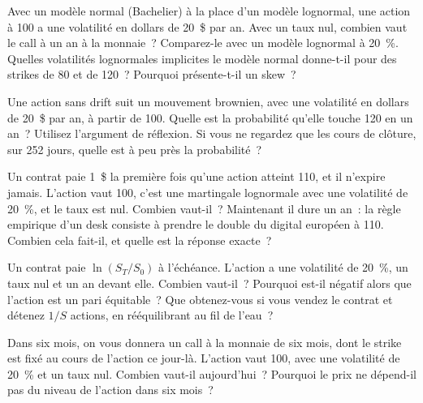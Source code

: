 \begin{question}\label{iq:iv2:pricing-and-numerics:19}
Avec un modèle normal (Bachelier) à la place d'un modèle lognormal, une action à 100 a une volatilité en dollars de 20~\$ par an. Avec un taux nul, combien vaut le call à un an à la monnaie~? Comparez-le avec un modèle lognormal à 20~\%. Quelles volatilités lognormales implicites le modèle normal donne-t-il pour des strikes de 80 et de 120~? Pourquoi présente-t-il un skew~?
\end{question}

\begin{question}\label{iq:iv2:pricing-and-numerics:20}
Une action sans drift suit un mouvement brownien, avec une volatilité en dollars de 20~\$ par an, à partir de 100. Quelle est la probabilité qu'elle touche 120 en un an~? Utilisez l'argument de réflexion. Si vous ne regardez que les cours de clôture, sur 252 jours, quelle est à peu près la probabilité~?
\end{question}

\begin{question}\label{iq:iv2:pricing-and-numerics:21}
Un contrat paie 1~\$ la première fois qu'une action atteint 110, et il n'expire jamais. L'action vaut 100, c'est une martingale lognormale avec une volatilité de 20~\%, et le taux est nul. Combien vaut-il~? Maintenant il dure un an~: la règle empirique d'un desk consiste à prendre le double du digital européen à 110. Combien cela fait-il, et quelle est la réponse exacte~?
\end{question}

\begin{question}\label{iq:iv2:pricing-and-numerics:22}
Un contrat paie $\ln(S_T/S_0)$ à l'échéance. L'action a une volatilité de 20~\%, un taux nul et un an devant elle. Combien vaut-il~? Pourquoi est-il négatif alors que l'action est un pari équitable~? Que obtenez-vous si vous vendez le contrat et détenez $1/S$ actions, en rééquilibrant au fil de l'eau~?
\end{question}

\begin{question}\label{iq:iv2:pricing-and-numerics:23}
Dans six mois, on vous donnera un call à la monnaie de six mois, dont le strike est fixé au cours de l'action ce jour-là. L'action vaut 100, avec une volatilité de 20~\% et un taux nul. Combien vaut-il aujourd'hui~? Pourquoi le prix ne dépend-il pas du niveau de l'action dans six mois~?
\end{question}

